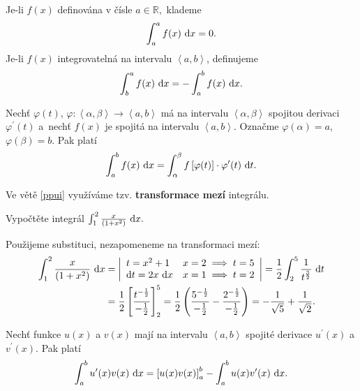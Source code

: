 \begin{definition}
Je-li $f(x)$ definována v čísle $a \in \mathbb R,$ klademe
$$\int _a ^a f(x)\, \mathop{}\!\mathrm{d} x = 0.$$
Je-li $f(x)$ integrovatelná na intervalu $\left<  a,b \right>$, definujeme
$$\int_b^a f(x)\, \mathop{}\!\mathrm{d} x = -\int_a^b f(x)\, \mathop{}\!\mathrm{d} x.$$
\end{definition}


\begin{veta}\label{ppui}
Nechť $\varphi (t)$, $\varphi\colon  \left<  \alpha, \beta \right>\to \left<  a,b \right>  $ má na intervalu $\left<  \alpha, \beta  \right> $ spojitou derivaci
$\varphi^\prime (t)$ a~nechť $f(x)$ je spojitá na intervalu $\left<  a,b \right>$.
Označme
$\varphi(\alpha)=a$, $\varphi(\beta)=b.$ Pak platí
$$\int _a ^b f(x)\, \mathop{}\!\mathrm{d} x = \int _\alpha ^\beta f \left [ \varphi(t) \right ]\cdot \varphi^\prime (t)\, \mathop{}\!\mathrm{d} t. $$
\end{veta}

\begin{pozn}
    Ve větě \ref{ppui} využíváme tzv. \textbf{transformace mezí} integrálu.
\end{pozn}

\begin{priklad}
Vypočtěte integrál $\int _1^2 \frac{x}{(1+x^2)}\, \mathop{}\!\mathrm{d} x.$
\end{priklad}

\begin{reseni}
Použijeme substituci, nezapomeneme na transformaci mezí:
\begin{align*}
\int _1^2 \frac{x}{(1+x^2)}\, \mathop{}\!\mathrm{d} x &= \left |\begin{array}{l l}
    t=x^2+1 & x=2\implies t=5 \\
    \mathop{}\!\mathrm{d} t = 2x \, \mathop{}\!\mathrm{d} x & x=1\implies t=2
\end{array}\right | = \frac{1}{2}\int _2^5 \frac{1}{t^{\frac{3}{2}}}\, \mathop{}\!\mathrm{d} t \\
&= \frac{1}{2}\left [ \frac{t^{-\frac{1}{2}}}{-\frac{1}{2}} \right ] _2^5 = \frac{1}{2}\left ( \frac{5^{-\frac{1}{2}}}{-\frac{1}{2}}-\frac{2^{-\frac{1}{2}}}{-\frac{1}{2}} \right )=-\frac{1}{\sqrt{5} }+\frac{1}{\sqrt{2} }.
\end{align*}
\end{reseni}

\begin{veta}
Nechť funkce $u(x)$ a $v(x)$ mají na intervalu $\left<  a,b \right> $ spojité derivace
$u^\prime (x)$ a $v^\prime (x)$. Pak platí
$$\int_a ^b u^\prime (x)v(x)\, \mathop{}\!\mathrm{d} x = \left [ u(x)v(x) \right ]_a^b -\int _a^b u(x)v^\prime(x)\, \mathop{}\!\mathrm{d} x.$$
\end{veta}

